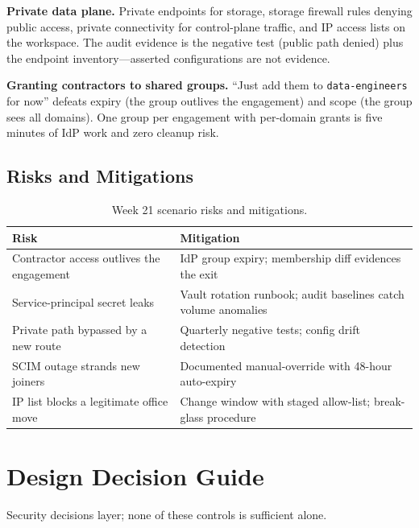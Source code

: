 \textbf{Private data plane.} Private endpoints for storage, storage firewall rules denying public access, private connectivity for control-plane traffic, and IP access lists on the workspace. The audit evidence is the negative test (public path denied) plus the endpoint inventory---asserted configurations are not evidence.

\begin{pitfall}
\textbf{Granting contractors to shared groups.} ``Just add them to \texttt{data-engineers} for now'' defeats expiry (the group outlives the engagement) and scope (the group sees all domains). One group per engagement with per-domain grants is five minutes of IdP work and zero cleanup risk.
\end{pitfall}

\subsection{Risks and Mitigations}
\begin{table}[H]
\centering
\small
\begin{tabular}{@{}p{4.6cm}p{7.6cm}@{}}
\toprule
\textbf{Risk} & \textbf{Mitigation} \\
\midrule
Contractor access outlives the engagement & IdP group expiry; membership diff evidences the exit \\
Service-principal secret leaks & Vault rotation runbook; audit baselines catch volume anomalies \\
Private path bypassed by a new route & Quarterly negative tests; config drift detection \\
SCIM outage strands new joiners & Documented manual-override with 48-hour auto-expiry \\
IP list blocks a legitimate office move & Change window with staged allow-list; break-glass procedure \\
\bottomrule
\end{tabular}
\caption{Week 21 scenario risks and mitigations.}
\label{tab:ch21-risks}
\end{table}

\section{Design Decision Guide}
%
Security decisions layer; none of these controls is sufficient alone.

